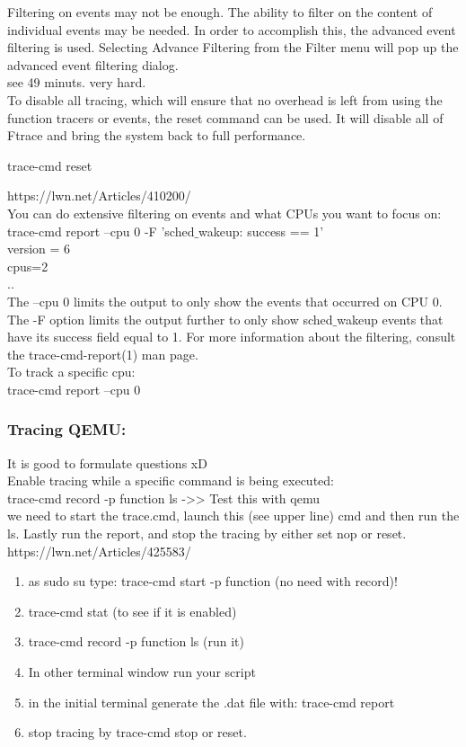 \documentclass[11pt, a4paper, oneside]{article}
\theoremstyle{definition}
\begin{document}
Filtering on events may not be enough. The ability to filter on the content of individual events may be needed. In order to accomplish this, the advanced event filtering is used. Selecting Advance Filtering from the Filter menu will pop up the advanced event filtering dialog. \\

see 49 minuts. very hard.\\

To disable all tracing, which will ensure that no overhead is left from using the function tracers or events, the reset command can be used. It will disable all of Ftrace and bring the system back to full performance.

trace-cmd reset

https://lwn.net/Articles/410200/\\

 You can do extensive filtering on events and what CPUs you want to focus on:
\\
     trace-cmd report --cpu 0 -F 'sched$\_$wakeup: success == 1'\\
    version = 6\\
    cpus=2\\
..\\
The --cpu 0 limits the output to only show the events that occurred on CPU 0. The -F option limits the output further to only show sched$\_$wakeup events that have its success field equal to 1. For more information about the filtering, consult the trace-cmd-report(1) man page.\\ 
	
To track a specific cpu:\\
trace-cmd report --cpu 0\\


\subsubsection{Tracing QEMU:}
It is good to formulate questions xD\\
Enable tracing while a specific command is being executed:\\
trace-cmd record -p function ls ->> Test this with qemu\\
we need to start the trace.cmd, launch this (see upper line) cmd and then run the ls. Lastly run the report, and stop the tracing by either set nop or reset.\\
https://lwn.net/Articles/425583/\\
\begin{enumerate}
	\item as sudo su type: trace-cmd start -p function (no need with record)!
	\item trace-cmd stat (to see if it is enabled)
	\item trace-cmd record -p function ls (run it)
	\item In other terminal window run your script
	\item in the initial terminal generate the .dat file with: trace-cmd report
	\item stop tracing by trace-cmd stop or reset.
\end{enumerate}
\end{document}
